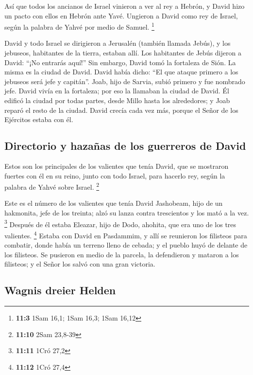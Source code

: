 \begin{paracol}{2}
 Así que todos los ancianos de Israel vinieron a ver al
rey a Hebrón, y David hizo un pacto con ellos en Hebrón ante Yavé.
Ungieron a David como rey de Israel, según la palabra de Yahvé por medio
de Samuel. \footnote{\textbf{11:3} 1Sam 16,1; 1Sam 16,3; 1Sam 16,12}

 David y todo Israel se dirigieron a Jerusalén (también
llamada Jebús), y los jebuseos, habitantes de la tierra, estaban allí.
 Los habitantes de Jebús dijeron a David: ``¡No entrarás
aquí!'' Sin embargo, David tomó la fortaleza de Sión. La misma es la
ciudad de David.  David había dicho: ``El que ataque
primero a los jebuseos será jefe y capitán''. Joab, hijo de Sarvia,
subió primero y fue nombrado jefe.  David vivía en la
fortaleza; por eso la llamaban la ciudad de David.  Él
edificó la ciudad por todas partes, desde Millo hasta los alrededores; y
Joab reparó el resto de la ciudad.  David crecía cada vez
más, porque el Señor de los Ejércitos estaba con él.

\hypertarget{directorio-y-hazauxf1as-de-los-guerreros-de-david}{%
\subsection{Directorio y hazañas de los guerreros de
David}\label{directorio-y-hazauxf1as-de-los-guerreros-de-david}}

 Estos son los principales de los valientes que tenía
David, que se mostraron fuertes con él en su reino, junto con todo
Israel, para hacerlo rey, según la palabra de Yahvé sobre Israel.
\footnote{\textbf{11:10} 2Sam 23,8-39}

 Este es el número de los valientes que tenía David
Jashobeam, hijo de un hakmonita, jefe de los treinta; alzó su lanza
contra trescientos y los mató a la vez. \footnote{\textbf{11:11} 1Cró
  27,2}  Después de él estaba Eleazar, hijo de Dodo,
ahohita, que era uno de los tres valientes. \footnote{\textbf{11:12}
  1Cró 27,4}  Estaba con David en Pasdammim, y allí se
reunieron los filisteos para combatir, donde había un terreno lleno de
cebada; y el pueblo huyó de delante de los filisteos.  Se
pusieron en medio de la parcela, la defendieron y mataron a los
filisteos; y el Señor los salvó con una gran victoria.

\hypertarget{wagnis-dreier-helden}{%
\subsection{Wagnis dreier Helden}\label{wagnis-dreier-helden}}


\end{paracol}
